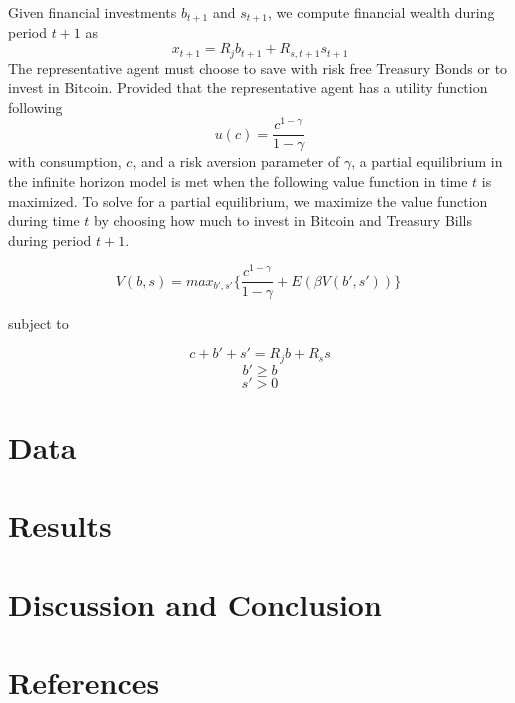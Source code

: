 \documentclass[]{article}
\begin{document}
Given financial investments \(b_{t+1}\) and \(s_{t+1}\), we compute
financial wealth during period \(t + 1\) as
\[x_{t+1} = R_jb_{t+1} + R_{s, t + 1} s_{t+1}\] The representative agent
must choose to save with risk free Treasury Bonds or to invest in
Bitcoin. Provided that the representative agent has a utility function
following \[u(c) = \frac{c^{1-\gamma}}{1 - \gamma}\] with consumption,
\(c\), and a risk aversion parameter of \(\gamma\), a partial
equilibrium in the infinite horizon model is met when the following
value function in time \(t\) is maximized. To solve for a partial
equilibrium, we maximize the value function during time \(t\) by
choosing how much to invest in Bitcoin and Treasury Bills during period
\(t+1\).

\[V (b, s) = max_{b',s'} \{\frac{c^{1-\gamma}}{1 - \gamma} + E(\beta V(b', s')) \}\ \]

subject to

\[c + b' + s' = R_jb + R_ss\] \[b' \geq b\] \[s' > 0\]

\section{Data}\label{data}

\section{Results}\label{results}

\section{Discussion and Conclusion}\label{discussion-and-conclusion}

\section{References}\label{references}
\end{document}
